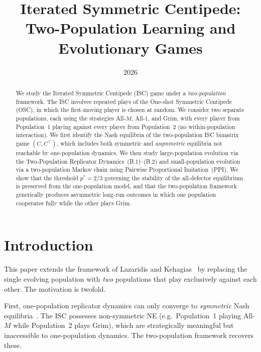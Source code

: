 \documentclass[12pt,a4paper]{article}
\title{\textbf{Iterated Symmetric Centipede:\\
Two-Population Learning and Evolutionary Games}}
\author{}
\date{2026}
\begin{document}
\maketitle

\begin{abstract}
We study the Iterated Symmetric Centipede (ISC) game under a
\emph{two-population} framework.  The ISC involves repeated plays of the
One-shot Symmetric Centipede (OSC), in which the first-moving player is chosen
at random.  We consider two separate populations, each using the strategies
All-$M$, All-$1$, and Grim, with every player from Population~1 playing against
every player from Population~2 (no within-population interaction).  We first
identify the Nash equilibria of the two-population ISC bimatrix game
$(C, C^\top)$, which includes both symmetric and \emph{asymmetric} equilibria
not reachable by one-population dynamics.  We then study large-population
evolution via the Two-Population Replicator Dynamics~(B.1)--(B.2) and
small-population evolution via a two-population Markov chain using Pairwise
Proportional Imitation~(PPI).  We show that the threshold $p^*=2/3$ governing
the stability of the all-defector equilibrium is preserved from the
one-population model, and that the two-population framework generically
produces asymmetric long-run outcomes in which one population cooperates fully
while the other plays Grim.
\end{abstract}

\tableofcontents
\newpage

\section{Introduction}

This paper extends the framework of Lazaridis and Kehagias~\cite{LK2026} by
replacing the single evolving population with \emph{two} populations that play
exclusively against each other.  The motivation is twofold.

First, one-population replicator dynamics can only converge to \emph{symmetric}
Nash equilibria~\cite{Sandholm2010}. The ISC possesses non-symmetric NE (e.g.\
Population~1 playing All-$M$ while Population~2 plays Grim), which are
strategically meaningful but inaccessible to one-population dynamics.  The
two-population framework recovers these.
\end{document}
